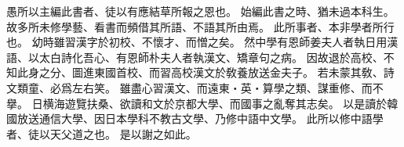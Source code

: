 愚所以主編此書者、徒以有應結草所報之恩也。
始編此書之時、猶未過本科生。
故多所未修學藝、看書而頻借其所語、不語其所由焉。
此所事者、本非學者所行也。
幼時雖習漢字於初校、不懷才、而憎之矣。
然中學有恩師姜夫人者執日用漢語、以太白詩化吾心、有恩師朴夫人者執漢文、矯章句之病。
因故退於高校、不知此身之分、圖進東國首校、而習高校漢文於敎養放送金夫子。
若未蒙其敎、詩文類童、必爲左右笑。
雖盡心習漢文、而遠東・英・算學之類、謀重修、而不擧。
日横海遊覽扶桑、欲讀和文於京都大學、而國事之亂奪其志矣。
以是讀於韓國放送通信大學、因日本學科不教古文學、乃修中語中文學。
此所以修中語學者、徒以天父道之也。
是以謝之如此。

